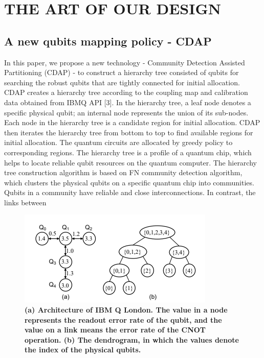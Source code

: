 \documentclass{article}
\begin{document}
		\section{THE ART OF OUR DESIGN}
			\subsection{A new qubits mapping policy - CDAP}
				In this paper, we propose a new technology - Community Detection Assisted Partitioning (CDAP) - to construct a hierarchy tree
				consisted of qubits for searching the robust qubits that are tightly
				connected for initial allocation. CDAP creates a hierarchy tree according to the coupling map and calibration data obtained from
				IBMQ API [3]. In the hierarchy tree, a leaf node denotes a specific physical qubit; an internal node represents the union of its
				sub-nodes. Each node in the hierarchy tree is a candidate region
				for initial allocation. CDAP then iterates the hierarchy tree from
				bottom to top to find available regions for initial allocation. The
				quantum circuits are allocated by greedy policy to corresponding regions. The hierarchy tree is a profile of a quantum chip, which helps
				to locate reliable qubit resources on the quantum computer. The
				hierarchy tree construction algorithm is based on FN community
				detection algorithm, which clusters the physical qubits on a specific quantum chip into communities. Qubits in a community have
				reliable and close interconnections. In contrast, the links between
				
				
				\begin{figure}[h]
					\centering
					\includegraphics[width=0.7\linewidth]{fig1}
					\caption{\textbf{ (a) Architecture of IBM Q London. The value in a
						node represents the readout error rate of the qubit, and the
						value on a link means the error rate of the CNOT operation.
						(b) The dendrogram, in which the values denote the index of
						the physical qubits.}}
					\label{fig:fig1}
				\end{figure}
				
\end{document}
